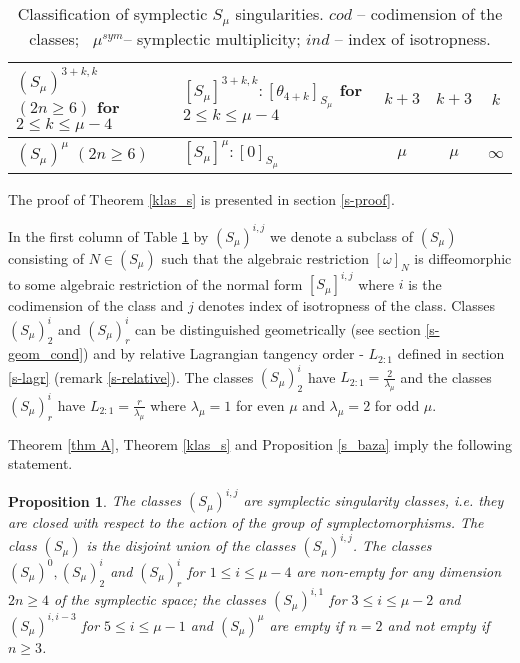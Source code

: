 \documentclass{amsart}
\newtheorem{prop}[thm]{Proposition}
\theoremstyle{definition}
\numberwithin{equation}{section}
\begin{document}
\begin{center}
\begin{table}[!h]
\begin{small}
\begin{tabular}{|p{2.9cm}|p{5.7cm}|c|c|c|}
    $(S_{\mu})^{3+k,k}$ \, $(2n\ge 6)$ \newline for  $2\leq k\leq \mu -4$ & $[S_{\mu}]^{3+k,k}: [\theta _{4+k}]_{S_{\mu}}$ \;\;for  $2\leq k\leq \mu -4$ &  $k+3$ & $k+3$ & $k$ \\ \hline

     $(S_{\mu})^{\mu}$ \;\;\;\;\; $(2n\ge 6)$ & $[S_{\mu}]^{\mu}: [0]_{S_{\mu}}$ &  $\mu$ & $\mu$ & $\infty $ \\ \hline
\end{tabular}

\smallskip

\caption{\small Classification of symplectic $S_{\mu}$ singularities.  \newline
$cod$ -- codimension of the classes; \ $\mu ^{sym}$-- symplectic multiplicity; \newline $ind$ --  index of isotropness.}\label{tabs}

\end{small}
\end{table}
\end{center}
\medskip

The proof of Theorem \ref{klas_s} is presented in section
\ref{s-proof}.

In the first column of Table \ref{tabs}  by $(S_{\mu})^{i,j}$ we denote a subclass of $(S_{\mu})$ consisting of $N\in (S_{\mu})$ such that the algebraic restriction $[\omega ]_N$ is diffeomorphic to some algebraic restriction of the normal form $[S_{\mu}]^{i,j}$ where $i$ is the codimension of the class and $j$ denotes index of isotropness of the class. Classes $(S_{\mu})^{i}_2$ and $(S_{\mu})^{i}_r$ can be distinguished geometrically (see section \ref{s-geom_cond}) and by relative Lagrangian tangency order - $L_{2:1}$ defined in  section \ref{s-lagr} (remark \ref{s-relative}). The classes $(S_{\mu})^{i}_2$ have $L_{2:1}=\frac{2}{\lambda_{\mu}}$ and the classes $(S_{\mu})^{i}_r$ have $L_{2:1}=\frac{r}{\lambda_{\mu}}$ where $\lambda_{\mu}\!=1$ for even $\mu$ and $\lambda_{\mu}\!=2$ for odd $\mu$.

Theorem \ref{thm A}, Theorem \ref{klas_s} and Proposition \ref{s_baza} imply the following statement.

\begin{prop}
\label{def-classes-s} The classes $(S_{\mu})^{i,j}$ are symplectic
singularity classes, i.e. they are closed with respect to the
action of the group of symplectomorphisms. The class $(S_{\mu})$ is
the disjoint union of the classes $(S_{\mu})^{i,j}$.
The classes $(S_{\mu})^0, (S_{\mu})^{i}_2$ and $(S_{\mu})^{i}_r$ for $1\leq i\leq \mu -4$ are non-empty for
any dimension $2n\ge 4$ of the symplectic space; the classes
$(S_{\mu})^{i,1}$ for $3\leq i\leq \mu -2$ and $(S_{\mu})^{i,i-3}$ for $5\leq i \leq \mu -1$ and $(S_{\mu})^{\mu}$ are empty if $n=2$ and not empty if $n\ge 3$.
\end{prop}
\end{document}
